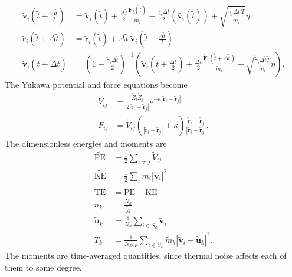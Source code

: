 \documentclass{article}
\begin{document}
\begin{align*}
\tilde{\mathbf{v}}_i\left(\tilde{t}+\frac{\Delta\tilde{t}}{2}\right) &= \tilde{\mathbf{v}}_i\left(\tilde{t}\right) + \frac{\Delta\tilde{t}}{2}\frac{\tilde{\mathbf{F}}_i\left(\tilde{t}\right)}{\tilde{m}_i} - \frac{\tilde{\gamma}_i\Delta\tilde{t}}{2}\left(\tilde{\mathbf{v}_i}\left(\tilde{t}\right)\right) + \sqrt{\frac{\tilde{\gamma}_i\Delta\tilde{t}\:\tilde{T}}{\tilde{m}_i}}\eta \\
\tilde{\mathbf{r}}_i\left(\tilde{t}+\Delta\tilde{t}\right) &= \tilde{\mathbf{r}}_i\left(\tilde{t}\right) + \Delta\tilde{t}\:\tilde{\mathbf{v}}_i\left(\tilde{t}+\frac{\Delta\tilde{t}}{2}\right) \\
\tilde{\mathbf{v}}_i\left(\tilde{t}+\Delta\tilde{t}\right) &= \left(1+\frac{\tilde{\gamma}_i\Delta\tilde{t}}{2}\right)^{-1} \left(\tilde{\mathbf{v}}_i\left(\tilde{t}+\frac{\Delta\tilde{t}}{2}\right) + \frac{\Delta\tilde{t}}{2}\frac{\tilde{\mathbf{F}}_i\left(\tilde{t}+\Delta\tilde{t}\right)}{\tilde{m}_i} + \sqrt{\frac{\tilde{\gamma}_i\Delta\tilde{t}\tilde{T}}{\tilde{m}_i}}\eta\right).
\end{align*}
The Yukawa potential and force equations become
\begin{align*}
\tilde{V}_{ij}&=\frac{\tilde{Z}_i\tilde{Z}_j}{2|\tilde{\mathbf{r}}_i-\tilde{\mathbf{r}}_j|}e^{-\kappa|\tilde{\mathbf{r}}_i-\tilde{\mathbf{r}}_j|}\\
\tilde{F}_{ij}&=\tilde{V}_{ij}\left(\frac{1}{|\tilde{\mathbf{r}}_i-\tilde{\mathbf{r}}_j|}+\kappa\right)\frac{\tilde{\mathbf{r}}_i-\tilde{\mathbf{r}}_j}{|\tilde{\mathbf{r}}_i-\tilde{\mathbf{r}}_j|}.
\end{align*}
The dimensionless energies and moments are
\begin{align*}
\tilde{\text{PE}} 	&= \frac{1}{2}\sum_{i\neq j}\tilde{V}_{ij} \\
\tilde{\text{KE}} 	&= \frac{1}{2}\sum_{i}\tilde{m}_i|\tilde{\mathbf{v}}_i|^2 \\
\tilde{\text{TE}} 	&= \tilde{\text{PE}} + \tilde{\text{KE}} \\
\tilde{n}_k			&= \frac{N_k}{\tilde{A}} \\
\tilde{\mathbf{u}}_k			&= \frac{1}{N_k}\sum_{i\in S_k}\tilde{\mathbf{v}}_i \\
\tilde{T}_k			&= \frac{1}{N_{DoF}}\sum_{i\in S_k}\tilde{m}_k\left|\tilde{\mathbf{v}}_i-\tilde{\mathbf{u}}_k\right|^2.
\end{align*}
The moments are time-averaged quantities, since thermal noise affects each of them to some degree.

\newpage


\end{document}
